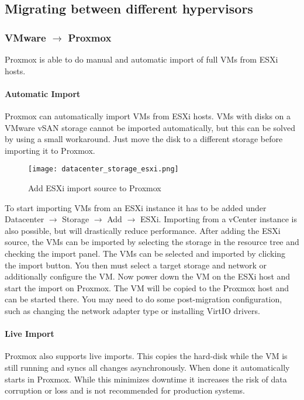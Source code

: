 \subsection{Migrating between different hypervisors}

\subsubsection{VMware $\rightarrow$ Proxmox}
Proxmox is able to do manual and automatic import of full VMs from ESXi hosts.

\paragraph{Automatic Import}
Proxmox can automatically import VMs from ESXi hosts. VMs with disks on a VMware vSAN storage cannot be imported automatically, but this can be solved by using a small workaround. Just move the disk to a different storage before importing it to Proxmox.
\begin{figure}[H]
    \centering
    \texttt{[image: datacenter\_storage\_esxi.png]}
    \caption{Add ESXi import source to Proxmox}
    \label{fig:proxmox_add_esxi_source}
\end{figure}
To start importing VMs from an ESXi instance it has to be added under Datacenter $\rightarrow$ Storage $\rightarrow$ Add $\rightarrow$ ESXi. \newline
Importing from a vCenter instance is also possible, but will drastically reduce performance.\newline
After adding the ESXi source, the VMs can be imported by selecting the storage in the resource tree and checking the import panel. The VMs can be selected and imported by clicking the import button. You then must select a target storage and network or additionally configure the VM. Now power down the VM on the ESXi host and start the import on Proxmox. The VM will be copied to the Proxmox host and can be started there. You may need to do some post-migration configuration, such as changing the network adapter type or installing VirtIO drivers.

\paragraph{Live Import}
Proxmox also supports live imports. This copies the hard-disk while the VM is still running and syncs all changes asynchronously. When done it automatically starts in Proxmox. While this minimizes downtime it increases the risk of data corruption or loss and is not recommended for production systems.


